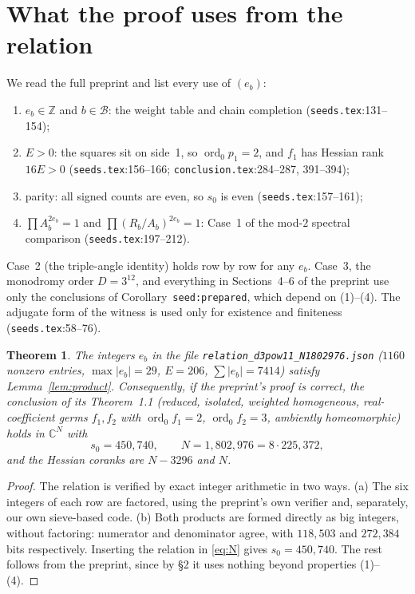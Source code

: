 \documentclass[11pt]{amsart}
\newtheorem{theorem}{Theorem}
\theoremstyle{remark}
\newcommand{\Z}{\mathbb{Z}}
\newcommand{\C}{\mathbb{C}}
\newcommand{\B}{\mathcal{B}}
\begin{document}
\section{What the proof uses from the relation}
We read the full preprint and list every use of $(e_b)$:
\begin{enumerate}
\item $e_b\in\Z$ and $b\in\B$: the weight table and chain completion (\texttt{seeds.tex}:131--154);
\item $E>0$: the squares sit on side~1, so $\operatorname{ord}_0p_1=2$, and $f_1$ has Hessian rank $16E>0$
 (\texttt{seeds.tex}:156--166; \texttt{conclusion.tex}:284--287, 391--394);
\item parity: all signed counts are even, so $s_0$ is even (\texttt{seeds.tex}:157--161);
\item $\prod A_b^{2e_b}=1$ and $\prod(R_b/A_b)^{2e_b}=1$: Case~1 of the mod-$2$ spectral comparison
 (\texttt{seeds.tex}:197--212).
\end{enumerate}
Case~2 (the triple-angle identity) holds row by row for any $e_b$. Case~3, the monodromy order $D=3^{12}$,
and everything in Sections~4--6 of the preprint use only the conclusions of
Corollary~\texttt{seed:prepared}, which depend on (1)--(4). The adjugate form of the witness is used only
for existence and finiteness (\texttt{seeds.tex}:58--76).

\begin{theorem}\label{thm:main}
The integers $e_b$ in the file \texttt{relation\_d3pow11\_N1802976.json} ($1160$ nonzero entries,
$\max|e_b|=29$, $E=206$, $\sum|e_b|=7414$) satisfy Lemma~\ref{lem:product}.
Consequently, if the preprint's proof is correct, the conclusion of its Theorem~1.1 (reduced, isolated,
weighted homogeneous, real-coefficient germs $f_1,f_2$ with $\operatorname{ord}_0f_1=2$,
$\operatorname{ord}_0f_2=3$, ambiently homeomorphic) holds in $\C^{N}$ with
\[
 s_0=450{,}740,\qquad N=1{,}802{,}976=8\cdot225{,}372,
\]
and the Hessian coranks are $N-3296$ and $N$.
\end{theorem}
\begin{proof}
The relation is verified by exact integer arithmetic in two ways. (a) The six integers of each row are
factored, using the preprint's own verifier and, separately, our own sieve-based code. (b) Both products are
formed directly as big integers, without factoring: numerator and denominator agree, with $118{,}503$ and
$272{,}384$ bits respectively. Inserting the relation in \eqref{eq:N} gives $s_0=450{,}740$. The rest
follows from the preprint, since by \S2 it uses nothing beyond properties (1)--(4).
\end{proof}
\end{document}
